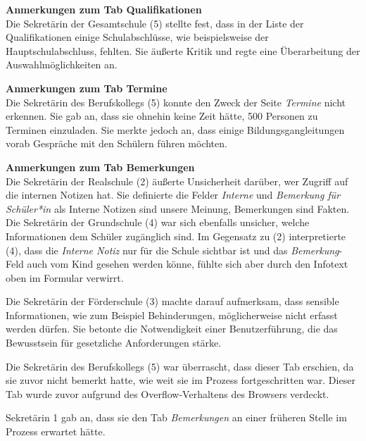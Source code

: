 \textbf{Anmerkungen zum Tab \glqq Qualifikationen\grqq{}}\\
Die Sekretärin der Gesamtschule (5) stellte fest, dass in der Liste der Qualifikationen einige Schulabschlüsse, wie beispielsweise der Hauptschulabschluss, fehlten. Sie äußerte Kritik und regte eine Überarbeitung der Auswahlmöglichkeiten an.

\textbf{Anmerkungen zum Tab \glqq Termine\grqq{}}\\
Die Sekretärin des Berufskollegs (5) konnte den Zweck der Seite \textit{Termine} nicht erkennen. Sie gab an, dass sie ohnehin keine Zeit hätte, 500 Personen zu Terminen einzuladen. Sie merkte jedoch an, dass einige Bildungsgangleitungen vorab Gespräche mit den Schülern führen möchten.

\textbf{Anmerkungen zum Tab \glqq Bemerkungen\grqq{}}\\
Die Sekretärin der Realschule (2) äußerte Unsicherheit darüber, wer Zugriff auf die internen Notizen hat. Sie definierte die Felder \textit{Interne} und \textit{Bemerkung für Schüler*in} als \glqq Interne Notizen sind unsere Meinung, Bemerkungen sind Fakten\grqq{}. Die Sekretärin der Grundschule (4) war sich ebenfalls unsicher, welche Informationen dem Schüler zugänglich sind. Im Gegensatz zu (2) interpretierte (4), dass die \textit{Interne Notiz} nur für die Schule sichtbar ist und das \textit{Bemerkung}-Feld auch vom Kind gesehen werden könne, fühlte sich aber durch den Infotext oben im Formular verwirrt.

Die Sekretärin der Förderschule (3) machte darauf aufmerksam, dass sensible Informationen, wie zum Beispiel Behinderungen, möglicherweise nicht erfasst werden dürfen. Sie betonte die Notwendigkeit einer Benutzerführung, die das Bewusstsein für gesetzliche Anforderungen stärke.

Die Sekretärin des Berufskollegs (5) war überrascht, dass dieser Tab erschien, da sie zuvor nicht bemerkt hatte, wie weit sie im Prozess fortgeschritten war. Dieser Tab wurde zuvor aufgrund des Overflow-Verhaltens des Browsers verdeckt.

Sekretärin 1 gab an, dass sie den Tab \textit{Bemerkungen} an einer früheren Stelle im Prozess erwartet hätte.

